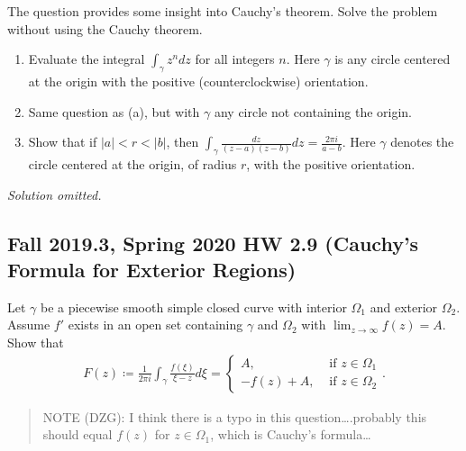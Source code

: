 \begin{problem}[?]

The question provides some insight into Cauchy's theorem. Solve the
problem without using the Cauchy theorem.

\begin{enumerate}
\def\labelenumi{\arabic{enumi}.}
\item
  Evaluate the integral \(\displaystyle{\int_{\gamma} z^n dz}\) for all
  integers \(n\). Here \(\gamma\) is any circle centered at the origin
  with the positive (counterclockwise) orientation.
\item
  Same question as (a), but with \(\gamma\) any circle not containing
  the origin.
\item
  Show that if \(|a|<r<|b|\), then
  \(\displaystyle{\int_{\gamma}\frac{dz}{(z-a)(z-b)} dz=\frac{2\pi i}{a-b}}\).
  Here \(\gamma\) denotes the circle centered at the origin, of radius
  \(r\), with the positive orientation.
\end{enumerate}

\end{problem}

\emph{Solution omitted.}

\hypertarget{fall-2019.3-spring-2020-hw-2.9-cauchys-formula-for-exterior-regions}{%
\subsection{Fall 2019.3, Spring 2020 HW 2.9 (Cauchy's Formula for
Exterior
Regions)}\label{fall-2019.3-spring-2020-hw-2.9-cauchys-formula-for-exterior-regions}}

\begin{problem}[?]

Let \(\gamma\) be a piecewise smooth simple closed curve with interior
\(\Omega_1\) and exterior \(\Omega_2\). Assume \(f'\) exists in an open
set containing \(\gamma\) and \(\Omega_2\) with
\(\lim_{z\to \infty} f(z) = A\). Show that
\begin{align*}
F(z) \coloneqq\frac{1}{2 \pi i} \int_{\gamma} \frac{f(\xi)}{\xi-z} d \xi=\left\{\begin{array}{ll}
A, & \text { if } z \in \Omega_{1} \\
-f(z)+A, & \text { if } z \in \Omega_{2}
\end{array}\right.
.\end{align*}

\begin{quote}
NOTE (DZG): I think there is a typo in this question\ldots.probably this
should equal \(f(z)\) for \(z\in \Omega_1\), which is Cauchy's
formula\ldots{}
\end{quote}

\end{problem}

